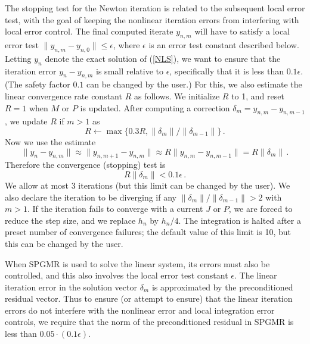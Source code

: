 The stopping test for the Newton iteration is related to the
subsequent local error test, with the goal of keeping the nonlinear
iteration errors from interfering with local error control.  The final
computed iterate $y_{n,m}$ will have to satisfy a local error test
$\|y_{n,m} - y_{n,0}\| \leq \epsilon$, where $\epsilon$ is an error
test constant described below.  Letting $y_n$ denote the exact
solution of (\ref{NLS}), we want to ensure that the iteration error
$y_n-y_{n,m}$ is small relative to $\epsilon$, specifically that it is
less than $0.1 \epsilon$.  (The safety factor $0.1$ can be changed by
the user.)  For this, we also estimate the linear convergence rate
constant $R$ as follows.  We initialize $R$ to 1, and reset $R = 1$
when $M$ or $P$ is updated.  After computing a correction
$\delta_m = y_{n,m} - y_{n,m-1}$, we update $R$ if $m > 1$ as
\begin{equation*}
  R \leftarrow \max\{0.3R , \|\delta_m\| / \|\delta_{m-1}\| \} \, . 
\end{equation*}
Now we use the estimate
\begin{equation*}
  \| y_n - y_{n,m} \| \approx \| y_{n,m+1} - y_{n,m} \| 
  \approx R \| y_{n,m} - y_{n,m-1} \|  =  R \|\delta_m \| \, . 
\end{equation*}
Therefore the convergence (stopping) test is 
\begin{equation*}
  R \|\delta_m \| < 0.1 \epsilon \, .
\end{equation*}
We allow at most 3 iterations (but this limit can be changed by the
user).  We also declare the iteration to be diverging if any 
$\|\delta_m\|/\|\delta_{m-1}\| > 2$ with $m > 1$. If the iteration
fails to converge with a current $J$ or $P$, we are forced to reduce
the step size, and we replace $h_n$ by $h_n/4$.  The integration is
halted after a preset number of convergence failures; the default
value of this limit is 10, but this can be changed by the user.

When SPGMR is used to solve the linear system, its errors must also be
controlled, and this also involves the local error test constant
$\epsilon$.  The linear iteration error in the solution vector
$\delta_m$ is approximated by the preconditioned residual vector.
Thus to ensure (or attempt to ensure) that the linear iteration errors
do not interfere with the nonlinear error and local integration error
controls, we require that the norm of the preconditioned residual in
SPGMR is less than $0.05 \cdot (0.1 \epsilon)$.

